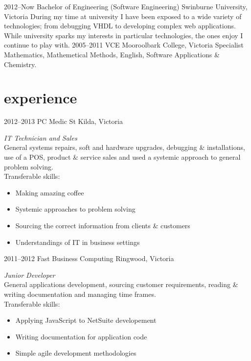 \documentclass[]{friggeri-cv} %
\begin{document}
\begin{entrylist}
\entry
{2012--Now}
{Bachelor {\normalfont of Engineering (Software Engineering)}}
{Swinburne University, Victoria}
{During my time at university I have been exposed to a wide variety of
technologies; from debugging VHDL to developing complex web applications.
While university sparks my interests in particular technologies, the ones enjoy
I continue to play with. }
\entry
{2005--2011}
{VCE {\normalfont}}
{Mooroolbark College, Victoria}
{Specialist Mathematics, Mathemetical Methods, English, Software Applications \& Chemistry.}
\end{entrylist}

\section{experience}

\begin{entrylist}
\entry
{2012--2013}
{PC Medic}
{St Kilda, Victoria}
{\emph{IT Technician and Sales} \\
General systems repairs, soft and hardware upgrades, debugging \& installations, use of a POS, product \& service sales and used a systemic approach to general problem solving. \\
Transferable skills:
\begin{itemize}
    \item Making amazing coffee
    \item Systemic approaches to problem solving
    \item Sourcing the correct information from clients \& customers
    \item Understandings of IT in business settings
\end{itemize}}
\entry
{2011--2012}
{Fast Business Computing}
{Ringwood, Victoria}
{\emph{Junior Developer} \\
General applications development, sourcing customer requirements, reading \& writing documentation and managing time frames. \\
Transferable skills:
\begin{itemize}
    \item Applying JavaScript to NetSuite developement
    \item Writing documentation for application code
    \item Simple agile development methodologies
\end{itemize}
}
\end{entrylist}
\end{document}
